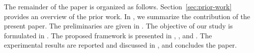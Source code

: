 The remainder of the paper is organized as follows. Section~\ref{sec:prior-work}
provides an overview of the prior work. In , we summarize the
contribution of the present paper. The preliminaries are given in
. The objective of our study is formulated in
. The proposed framework is presented in
, , and . The experimental
results are reported and discussed in , and
 concludes the paper.
